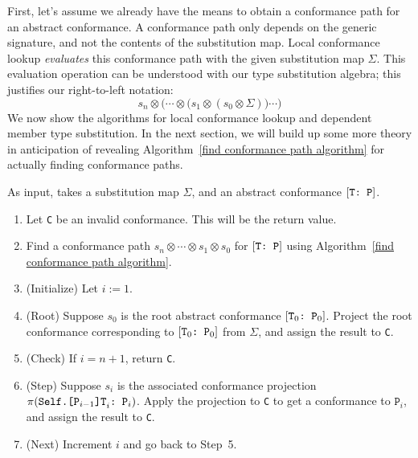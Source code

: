 \documentclass[../generics]{subfiles}
\begin{document}
First, let's assume we already have the means to obtain a conformance path for an abstract conformance. A conformance path only depends on the generic signature, and not the contents of the substitution map. Local conformance lookup \emph{evaluates} this conformance path with the given substitution map $\Sigma$. This evaluation operation can be understood with our type substitution algebra; this justifies our right-to-left notation:
\[s_n\otimes\bigl(\cdots\otimes \bigl(s_1 \otimes (s_0 \otimes \Sigma)\bigr) \cdots \bigr)\]
We now show the algorithms for local conformance lookup and dependent member type substitution. In the next section, we will build up some more theory in anticipation of revealing Algorithm~\ref{find conformance path algorithm} for actually finding conformance paths.

\begin{algorithm}\label{local conformance lookup algorithm}
As input, takes a substitution map $\Sigma$, and an abstract conformance $[\texttt{T:~P}]$.
\begin{enumerate}
\item Let \texttt{C} be an invalid conformance. This will be the return value.
\item Find a conformance path $s_n\otimes \cdots \otimes s_1\otimes s_0$ for $[\texttt{T:~P}]$ using Algorithm~\ref{find conformance path algorithm}.
\item (Initialize) Let $i := 1$.
\item (Root) Suppose $s_0$ is the root abstract conformance $[\texttt{$\texttt{T}_0$:~$\texttt{P}_0$}]$. Project the root conformance corresponding to $[\texttt{$\texttt{T}_0$:~$\texttt{P}_0$}]$ from $\Sigma$, and assign the result to \texttt{C}.
\item (Check) If $i=n+1$, return \texttt{C}.
\item (Step) Suppose $s_i$ is the associated conformance projection $\pi(\texttt{$\texttt{Self.[$\texttt{P}_{i-1}$]T}_i$:~$\texttt{P}_i$})$. Apply the projection to \texttt{C} to get a conformance to $\texttt{P}_i$, and assign the result to \texttt{C}.
\item (Next) Increment $i$ and go back to Step~5.
\end{enumerate}
\end{algorithm}
\end{document}
